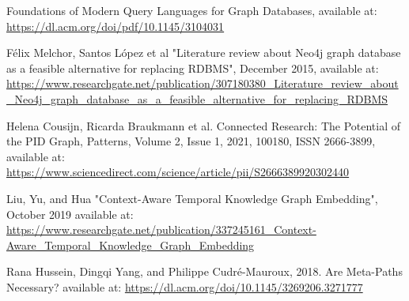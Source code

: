 \documentclass[conference]{IEEEtran}
\begin{document}
\begin{thebibliography}{00}
 Foundations of Modern Query Languages for Graph Databases, available at: \url{https://dl.acm.org/doi/pdf/10.1145/3104031}


Félix Melchor, Santos López et al "Literature review about Neo4j graph database as a feasible alternative for replacing RDBMS", December 2015, available at: \url{https://www.researchgate.net/publication/307180380_Literature_review_about_Neo4j_graph_database_as_a_feasible_alternative_for_replacing_RDBMS}

 Helena Cousijn, Ricarda Braukmann et al. Connected Research: The Potential of the PID Graph, Patterns, Volume 2, Issue 1, 2021, 100180, ISSN 2666-3899, available at: \url{https://www.sciencedirect.com/science/article/pii/S2666389920302440}

Liu, Yu, and Hua "Context-Aware Temporal Knowledge Graph Embedding", October 2019
available at: \url{https://www.researchgate.net/publication/337245161_Context-Aware_Temporal_Knowledge_Graph_Embedding}

Rana Hussein, Dingqi Yang, and Philippe Cudré-Mauroux, 2018. Are Meta-Paths Necessary? available at: \url{https://dl.acm.org/doi/10.1145/3269206.3271777}



\end{thebibliography}
\end{document}
